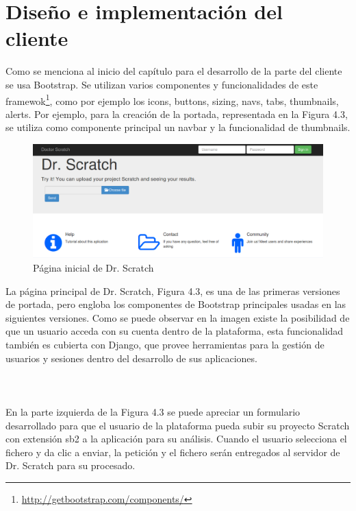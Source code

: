 \documentclass[a4paper, 12pt]{book}
\begin{document}
\section{Diseño e implementación del cliente}
\label{sec:servidor}

Como se menciona al inicio del capítulo para el desarrollo de la parte del cliente se usa
Bootstrap. Se utilizan varios componentes y funcionalidades de este
 framewok\footnote{\url{http://getbootstrap.com/components/}}, como por ejemplo los icons,
buttons, sizing, navs, tabs, thumbnails, alerts. Por ejemplo, para la creación de la 
portada, representada en la Figura 4.3, se utiliza como componente principal un navbar y la
funcionalidad de thumbnails. \\

 \begin{figure}
		\graphicspath{{img/}}
    \includegraphics[bb=0 0 800 600, width=12cm, keepaspectratio]{portada.png}
		\caption{Página inicial de Dr. Scratch}
    \label{figura:foro_hilos}
 \end{figure} 

La página principal de Dr. Scratch, Figura 4.3, es una de las primeras 
versiones de portada, pero engloba los componentes de Bootstrap principales 
usadas en las siguientes versiones. Como se puede observar en la imagen existe la 
posibilidad de que un usuario acceda con su cuenta dentro de la plataforma, esta
funcionalidad también es cubierta con Django, que provee herramientas para la 
gestión de usuarios y sesiones dentro del desarrollo de sus aplicaciones. \\ \\ \\ \\

En la parte izquierda de la Figura 4.3 se puede apreciar un formulario desarrollado
para que el usuario de la plataforma pueda subir su proyecto Scratch con extensión sb2
a la aplicación para su análisis. Cuando el usuario selecciona el fichero y da clic
a enviar, la petición y el fichero serán entregados al servidor de Dr. Scratch para
su procesado. \\
\end{document}
